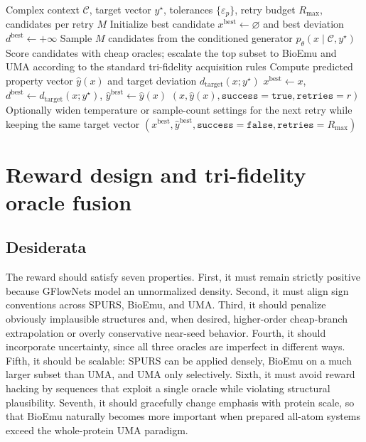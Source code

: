 \documentclass[11pt]{article}
\begin{document}
\begin{algorithm}[H]
\caption{Target-conditioned complex-aware generation with bounded retries}
\label{alg:targeted_v11}
\begin{algorithmic}[1]
\Require Complex context $\mathcal{C}$, target vector $y^\star$, tolerances $\{\varepsilon_p\}$, retry budget $R_{\max}$, candidates per retry $M$
\State Initialize best candidate $x^{\mathrm{best}}\leftarrow \varnothing$ and best deviation $d^{\mathrm{best}}\leftarrow +\infty$
    \State Sample $M$ candidates from the conditioned generator $p_\theta(x\mid \mathcal{C},y^\star)$
    \State Score candidates with cheap oracles; escalate the top subset to BioEmu and UMA according to the standard tri-fidelity acquisition rules
        \State Compute predicted property vector $\hat y(x)$ and target deviation $d_{\mathrm{target}}(x;y^\star)$
            \State $x^{\mathrm{best}}\leftarrow x$, $d^{\mathrm{best}}\leftarrow d_{\mathrm{target}}(x;y^\star)$, $\hat y^{\mathrm{best}}\leftarrow \hat y(x)$
        \EndIf
            \State \Return $(x,\hat y(x),\texttt{success}=\texttt{true},\texttt{retries}=r)$
        \EndIf
    \EndFor
    \State Optionally widen temperature or sample-count settings for the next retry while keeping the same target vector
\EndFor
\State \Return $(x^{\mathrm{best}},\hat y^{\mathrm{best}},\texttt{success}=\texttt{false},\texttt{retries}=R_{\max})$
\end{algorithmic}
\end{algorithm}


\section{Reward design and tri-fidelity oracle fusion}
\label{sec:reward}

\subsection{Desiderata}

The reward should satisfy seven properties. First, it must remain strictly positive because GFlowNets model an unnormalized density. Second, it must align sign conventions across SPURS, BioEmu, and UMA. Third, it should penalize obviously implausible structures and, when desired, higher-order cheap-branch extrapolation or overly conservative near-seed behavior. Fourth, it should incorporate uncertainty, since all three oracles are imperfect in different ways. Fifth, it should be scalable: SPURS can be applied densely, BioEmu on a much larger subset than UMA, and UMA only selectively. Sixth, it must avoid reward hacking by sequences that exploit a single oracle while violating structural plausibility. Seventh, it should gracefully change emphasis with protein scale, so that BioEmu naturally becomes more important when prepared all-atom systems exceed the whole-protein UMA paradigm.
\end{document}
